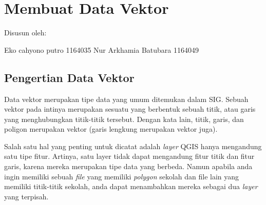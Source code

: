 \section{Membuat Data Vektor}
Disusun oleh:

Eko cahyono putro 1164035
Nur Arkhamia Batubara 1164049

\subsection {Pengertian Data Vektor}
Data vektor merupakan tipe data yang umum ditemukan dalam SIG. Sebuah vektor pada intinya merupakan sesuatu yang berbentuk sebuah titik, atau garis yang menghubungkan titik-titik tersebut. Dengan kata lain, titik, garis, dan poligon merupakan vektor (garis lengkung merupakan vektor juga).

Salah satu hal yang penting untuk dicatat adalah \textit{layer} QGIS hanya mengandung satu tipe fitur. Artinya, satu layer tidak dapat mengandung fitur titik dan fitur garis, karena mereka merupakan tipe data yang berbeda. Namun apabila anda ingin memiliki sebuah \textit{file} yang memiliki \textit{polygon} sekolah dan file lain yang memiliki titik-titik sekolah, anda dapat menambahkan mereka sebagai dua \textit{layer} yang terpisah\cite{setiawan2018membuka}.
